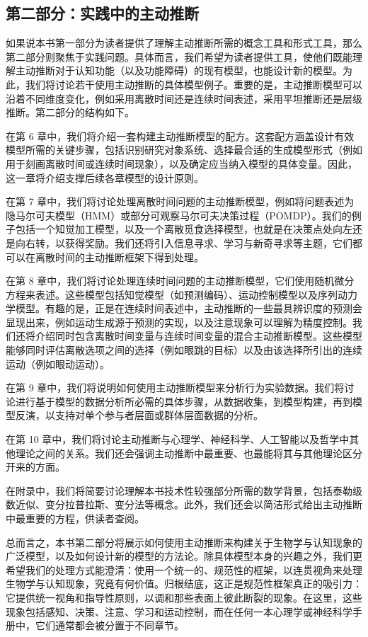 \subsection{第二部分：实践中的主动推断}

如果说本书第一部分为读者提供了理解主动推断所需的概念工具和形式工具，那么第二部分则聚焦于实践问题。具体而言，我们希望为读者提供工具，使他们既能理解主动推断对于认知功能（以及功能障碍）的现有模型，也能设计新的模型。为此，我们将讨论若干使用主动推断的具体模型例子。重要的是，主动推断模型可以沿着不同维度变化，例如采用离散时间还是连续时间表述，采用平坦推断还是层级推断。第二部分的结构如下。

在第 6 章中，我们将介绍一套构建主动推断模型的配方。这套配方涵盖设计有效模型所需的关键步骤，包括识别研究对象系统、选择最合适的生成模型形式（例如用于刻画离散时间或连续时间现象），以及确定应当纳入模型的具体变量。因此，这一章将介绍支撑后续各章模型的设计原则。

在第 7 章中，我们将讨论处理离散时间问题的主动推断模型，例如将问题表述为隐马尔可夫模型（HMM）或部分可观察马尔可夫决策过程（POMDP）。我们的例子包括一个知觉加工模型，以及一个离散觅食选择模型，也就是在决策点处向左还是向右转，以获得奖励。我们还将引入信息寻求、学习与新奇寻求等主题，它们都可以在离散时间的主动推断框架下得到处理。

在第 8 章中，我们将讨论处理连续时间问题的主动推断模型，它们使用随机微分方程来表述。这些模型包括知觉模型（如预测编码）、运动控制模型以及序列动力学模型。有趣的是，正是在连续时间表述中，主动推断的一些最具辨识度的预测会显现出来，例如运动生成源于预测的实现，以及注意现象可以理解为精度控制。我们还将介绍同时包含离散时间变量与连续时间变量的混合主动推断模型。这些模型能够同时评估离散选项之间的选择（例如眼跳的目标）以及由该选择所引出的连续运动（例如眼动运动）。

在第 9 章中，我们将说明如何使用主动推断模型来分析行为实验数据。我们将讨论进行基于模型的数据分析所必需的具体步骤，从数据收集，到模型构建，再到模型反演，以支持对单个参与者层面或群体层面数据的分析。

在第 10 章中，我们将讨论主动推断与心理学、神经科学、人工智能以及哲学中其他理论之间的关系。我们还会强调主动推断中最重要、也最能将其与其他理论区分开来的方面。

在附录中，我们将简要讨论理解本书技术性较强部分所需的数学背景，包括泰勒级数近似、变分拉普拉斯、变分法等概念。此外，我们还会以简洁形式给出主动推断中最重要的方程，供读者查阅。

总而言之，本书第二部分将展示如何使用主动推断来构建关于生物学与认知现象的广泛模型，以及如何设计新的模型的方法论。除具体模型本身的兴趣之外，我们更希望我们的处理方式能澄清：使用一个统一的、规范性的框架，以连贯视角来处理生物学与认知现象，究竟有何价值。归根结底，这正是规范性框架真正的吸引力：它提供统一视角和指导性原则，以调和那些表面上彼此断裂的现象。在这里，这些现象包括感知、决策、注意、学习和运动控制，而在任何一本心理学或神经科学手册中，它们通常都会被分置于不同章节。

